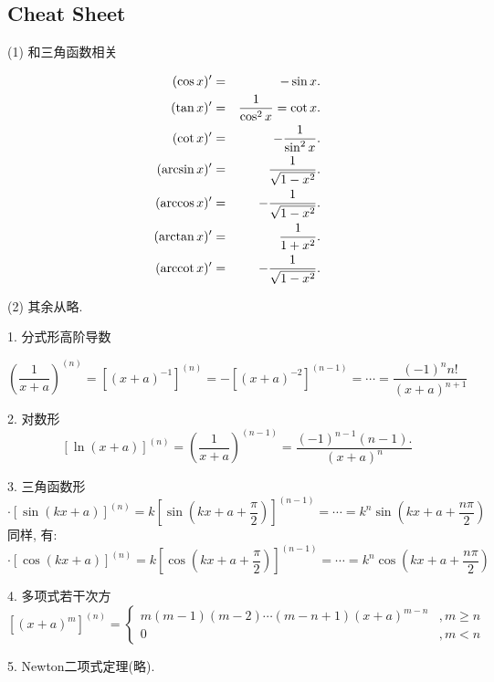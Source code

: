 \subsection{Cheat Sheet}
(1) 和三角函数相关

\begin{eqnarray}
    (\cos x)^{\prime} & = & -\sin x .\\
    (\tan x)^{\prime} & = & \frac{1}{\cos ^{2} x} = \cot{x}.\\
    (\cot x)^{\prime} & = & -\frac{1}{\sin ^{2} x}.\\ 
    (\arcsin x)^{\prime} & = & \frac{1}{\sqrt{1-x^{2}}} .\\
    (\arccos x)^{\prime} & = & -\frac{1}{\sqrt{1-x^{2}}} .\\
    (\arctan x)^{\prime} & = & \frac{1}{1+x^{2}} .\\
    (\operatorname{arccot} x)'&=&-{1\over \sqrt{1-x^2}}.
\end{eqnarray}

(2) 其余从略. 


1. 分式形高阶导数

$$
\left(\frac{1}{x+a}\right)^{(n)}=\left[(x+a)^{-1}\right]^{(n)}=-\left[(x+a)^{-2}\right]^{(n-1)}=\cdots=\frac{(-1)^{n} n !}{(x+a)^{n+1}}
$$

2. 对数形
$$
[\ln (x+a)]^{(n)}=\left(\frac{1}{x+a}\right)^{(n-1)}=\frac{(-1)^{n-1}(n-1) .}{(x+a)^{n}}
$$

3. 三角函数形
$$
\cdot[\sin (k x+a)]^{(n)}=k\left[\sin \left(k x+a+\frac{\pi}{2}\right)\right]^{(n-1)}=\cdots=k^{n} \sin \left(k x+a+\frac{n \pi}{2}\right) 
$$
同样, 有: 
$$
\cdot[\cos (k x+a)]^{(n)}=k\left[\cos \left(k x+a+\frac{\pi}{2}\right)\right]^{(n-1)}=\cdots=k^{n} \cos \left(k x+a+\frac{n \pi}{2}\right)
$$

4. 多项式若干次方
$$
\left[(x+a)^{m}\right]^{(n)}=\left\{\begin{array}{cc}
    m(m-1)(m-2) \cdots(m-n+1)(x+a)^{m-n} & , m \geq n \\
    0 & , m<n
    \end{array}\right.
$$

5. Newton二项式定理(略).